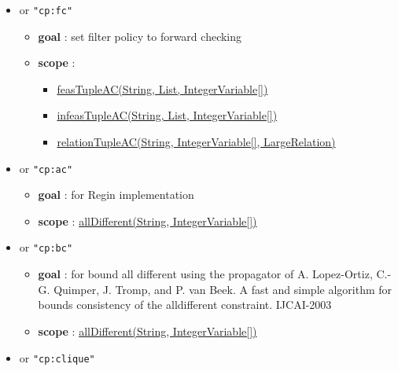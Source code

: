 \begin{itemize}
\begin{itemize}
		\end{itemize}
		\item \label{cextfc:cextfcoptions}\hypertarget{cextfc:cextfcoptions}{}					
		 or \texttt{"cp:fc"}
		\begin{itemize}
				\item \textbf{goal} : set filter policy to forward checking
				\item \textbf{scope} : 
					\begin{itemize}
						\item \hyperlink{feastupleac:feastupleacconstraint}{feasTupleAC(String, List, IntegerVariable[])}
						\item \hyperlink{infeastupleacin:feastupleacconstraint}{infeasTupleAC(String, List, IntegerVariable[])}
						\item \hyperlink{relationtupleac:relationtupleacconstraint}{relationTupleAC(String, IntegerVariable[], LargeRelation)}
					\end{itemize}	
		\end{itemize}
		\item \label{calldiffac:calldiffacoptions}\hypertarget{calldiffac:calldiffacoptions}{}
		 or \texttt{"cp:ac"}
		\begin{itemize}
				\item \textbf{goal} : for Regin implementation
				\item \textbf{scope} : \hyperlink{alldifferent:alldifferentconstraint}{allDifferent(String, IntegerVariable[])}
		\end{itemize}
		\item \label{calldiffbc:calldiffbcoptions}\hypertarget{calldiffbc:calldiffbcoptions}{}
		 or \texttt{"cp:bc"}
		\begin{itemize}
				\item \textbf{goal} : for bound all different using the propagator of A. Lopez-Ortiz, C.-G. Quimper, J. Tromp, and P. van Beek. A fast and simple algorithm for bounds consistency of the alldifferent constraint. IJCAI-2003
				\item \textbf{scope} : \hyperlink{alldifferent:alldifferentconstraint}{allDifferent(String, IntegerVariable[])}
		\end{itemize}
		\item \label{calldiffclique:calldiffcliqueoptions}\hypertarget{calldiffclique:calldiffcliqueoptions}{}
		 or \texttt{"cp:clique"}
		\begin{itemize}

\end{itemize}
\end{itemize}
